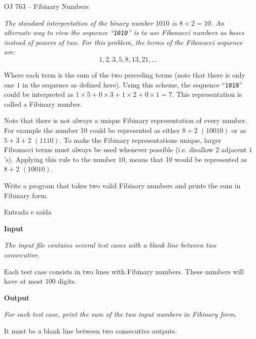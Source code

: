 \begin{frame}[fragile]{OJ 763 -- Fibinary Numbers}

{\it
The standard interpretation of the binary number $1010$ is $8 + 2 = 10$. An alternate way to view the
sequence ``\texttt{1010}'' is to use Fibonacci numbers as bases instead of powers of two. For this problem, the
terms of the Fibonacci sequence are:
\[
1, 2, 3, 5, 8, 13, 21, \ldots
\]

Where each term is the sum of the two preceding terms (note that there is only one $1$ in the sequence
as defined here). Using this scheme, the sequence ``\texttt{1010}'' could be interpreted as $1\times 5+0\times 3+1\times 2+0\times 1 = 7$.
This representation is called a Fibinary number.

Note that there is not always a unique Fibinary representation of every number. For example the
number 10 could be represented as either $8 + 2$ $(10010)$ or as $5 + 3 + 2$ $(1110)$. To make the Fibinary
representations unique, larger Fibonacci terms must always be used whenever possible (i.e. disallow
$2$ adjacent $1$’s). Applying this rule to the number $10$, means that 10 would be represented as $8+2$
$(10010)$.

Write a program that takes two valid Fibinary numbers and prints the sum in Fibinary form.
}

\end{frame}

\begin{frame}[fragile]{Entrada e saída}

\textbf{Input}

{\it The input file contains several test cases with a blank line between two consecutive.

Each test case consists in two lines with Fibinary numbers. These numbers will have at most $100$ digits.}

\vspace{0.3in}


\textbf{Output}

{\it For each test case, print the sum of the two input numbers in Fibinary form.

It must be a blank line between two consecutive outputs.}

\end{frame}

